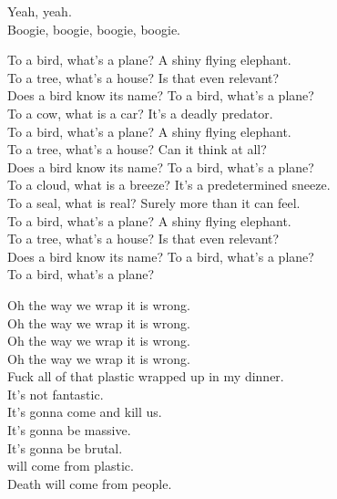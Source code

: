 Yeah, yeah. \\
Boogie, boogie, boogie, boogie. \\




To a bird, what's a plane? A shiny flying elephant. \\
To a tree, what's a house? Is that even relevant? \\

Does a bird know its name? To a bird, what's a plane? \\

To a cow, what is a car? It's a deadly predator. \\
To a bird, what's a plane? A shiny flying elephant. \\
To a tree, what's a house? Can it think at all? \\

Does a bird know its name? To a bird, what's a plane? \\

To a cloud, what is a breeze? It's a predetermined sneeze. \\
To a seal, what is real? Surely more than it can feel. \\
To a bird, what's a plane? A shiny flying elephant. \\
To a tree, what's a house? Is that even relevant? \\

Does a bird know its name? To a bird, what's a plane? \\

To a bird, what's a plane? \\




Oh the way we wrap it is wrong. \\
Oh the way we wrap it is wrong. \\
Oh the way we wrap it is wrong. \\
Oh the way we wrap it is wrong. \\

Fuck all of that plastic wrapped up in my dinner. \\
It's not fantastic. \\
It's gonna come and kill us. \\
It's gonna be massive. \\
It's gonna be brutal. \\
 will come from plastic. \\
Death will come from people. \\

